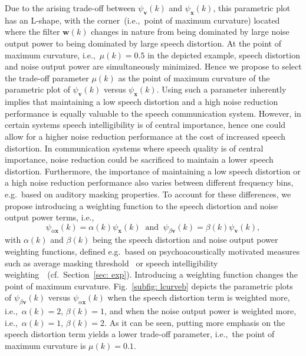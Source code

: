 \documentclass{article}
\begin{document}
Due to the arising trade-off between $\psi_{\mathbf{v}}(k)$ and $\psi_{\mathbf{x}}(k)$, this parametric plot has an L-shape, with the corner~(i.e.,~point of maximum curvature) located where the filter $\mathbf{w}(k)$ changes in nature from being dominated by large noise output power to being dominated by large speech distortion.
At the point of maximum curvature, i.e.,~$\mu(k) = 0.5$ in the depicted example, speech distortion and noise output power are simultaneously minimized.
Hence we propose to select the trade-off parameter $\mu(k)$ as the point of maximum curvature of the parametric plot of $\psi_{\mathbf{v}}(k)$ versus $\psi_{\mathbf{x}}(k)$. \newline
Using such a parameter inherently implies that maintaining a low speech distortion and a high noise reduction performance is equally valuable to the speech communication system.
However, in certain systems speech intelligibility is of central importance, hence one could allow for a higher noise reduction performance at the cost of increased speech distortion. 
In communication systems where speech quality is of central importance, noise reduction could be sacrificed to maintain a lower speech distortion.
Furthermore, the importance of maintaining a low speech distortion or a high noise reduction performance also varies between different frequency bins, e.g.~based on auditory masking properties.
To account for these differences, we propose introducing a weighting function to the speech distortion and noise output power terms, i.e.,
\begin{equation}
  \psi_{\alpha \mathbf{x}}(k) = \alpha(k) \psi_{\mathbf{x}}(k)  \; \; \text{and} \; \; \psi_{\beta \mathbf{v}}(k) = \beta(k) \psi_{\mathbf{v}}(k),
\end{equation}
with $\alpha(k)$ and $\beta(k)$ being the speech distortion and noise output power weighting functions, defined e.g.~based on psychoacoustically motivated measures such as average masking threshold~\cite{Painter_IEEE_2000} or speech intelligibility weighting~\cite{ASA}~(cf.~Section~\ref{sec: exp}).
Introducing a weighting function changes the point of maximum curvature.
Fig.~\ref{subfig: lcurveb} depicts the parametric plots of $\psi_{\beta \mathbf{v}}(k)$ versus $\psi_{\alpha \mathbf{x}}(k)$ when the speech distortion term is weighted more, i.e.,~$\alpha(k) = 2$, $\beta(k) = 1$, and when the noise output power is weighted more, i.e.,~$\alpha(k) = 1$, $\beta(k) = 2$.
As it can be seen, putting more emphasis on the speech distortion term yields a lower trade-off parameter, i.e.,~the point of maximum curvature is $\mu(k) = 0.1$.
\end{document}
